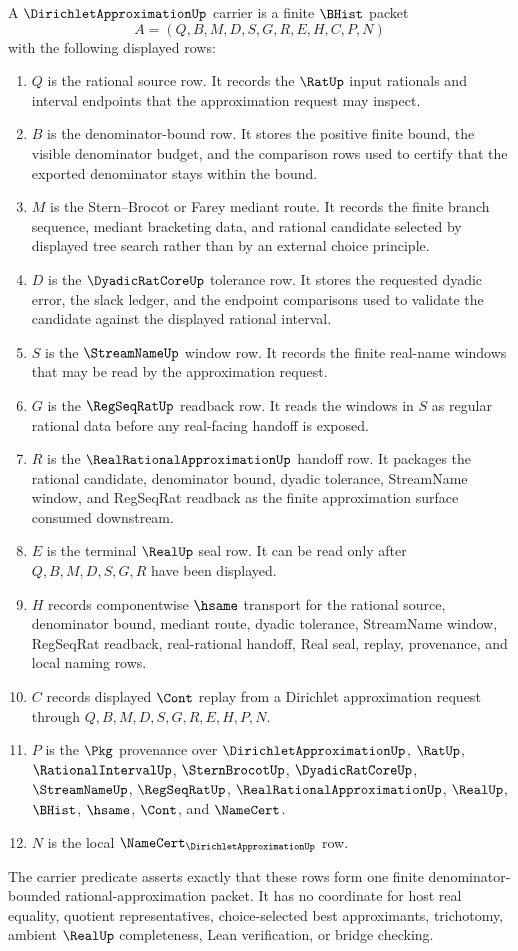 \begin{definition}
\label{def:dirichlet-approximation-carrier}
A $\DirichletApproximationUp$ carrier is a finite $\BHist$ packet
$$
A=(Q,B,M,D,S,G,R,E,H,C,P,N)
$$
with the following displayed rows:
\begin{enumerate}
\item $Q$ is the rational source row. It records the $\RatUp$ input rationals and interval endpoints that the approximation request may inspect.
\item $B$ is the denominator-bound row. It stores the positive finite bound, the visible denominator budget, and the comparison rows used to certify that the exported denominator stays within the bound.
\item $M$ is the Stern--Brocot or Farey mediant route. It records the finite branch sequence, mediant bracketing data, and rational candidate selected by displayed tree search rather than by an external choice principle.
\item $D$ is the $\DyadicRatCoreUp$ tolerance row. It stores the requested dyadic error, the slack ledger, and the endpoint comparisons used to validate the candidate against the displayed rational interval.
\item $S$ is the $\StreamNameUp$ window row. It records the finite real-name windows that may be read by the approximation request.
\item $G$ is the $\RegSeqRatUp$ readback row. It reads the windows in $S$ as regular rational data before any real-facing handoff is exposed.
\item $R$ is the $\RealRationalApproximationUp$ handoff row. It packages the rational candidate, denominator bound, dyadic tolerance, StreamName window, and RegSeqRat readback as the finite approximation surface consumed downstream.
\item $E$ is the terminal $\RealUp$ seal row. It can be read only after $Q,B,M,D,S,G,R$ have been displayed.
\item $H$ records componentwise $\hsame$ transport for the rational source, denominator bound, mediant route, dyadic tolerance, StreamName window, RegSeqRat readback, real-rational handoff, Real seal, replay, provenance, and local naming rows.
\item $C$ records displayed $\Cont$ replay from a Dirichlet approximation request through $Q,B,M,D,S,G,R,E,H,P,N$.
\item $P$ is the $\Pkg$ provenance over $\DirichletApproximationUp$, $\RatUp$, $\RationalIntervalUp$, $\SternBrocotUp$, $\DyadicRatCoreUp$, $\StreamNameUp$, $\RegSeqRatUp$, $\RealRationalApproximationUp$, $\RealUp$, $\BHist$, $\hsame$, $\Cont$, and $\NameCert$.
\item $N$ is the local $\NameCert_{\DirichletApproximationUp}$ row.
\end{enumerate}
The carrier predicate asserts exactly that these rows form one finite denominator-bounded rational-approximation packet. It has no coordinate for host real equality, quotient representatives, choice-selected best approximants, trichotomy, ambient $\RealUp$ completeness, Lean verification, or bridge checking.
\end{definition}

